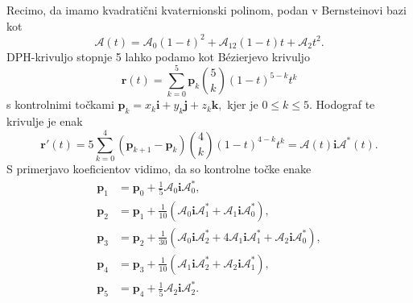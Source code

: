 \documentclass[12pt,a4paper,twoside]{article}
\theoremstyle{definition} %
\theoremstyle{plain} %
\theoremstyle{primerstyle}
\numberwithin{equation}{section}  %
\newcommand{\tV}{\mathbf{t}}
\newcommand{\pV}{\mathbf{p}}
\newcommand{\rV}{\mathbf{r}}
\newcommand{\iV}{\mathbf{i}}
\newcommand{\jV}{\mathbf{j}}
\newcommand{\kV}{\mathbf{k}}
\newcommand{\AQ}{\mathcal{A}}
\begin{document}
Recimo, da imamo kvadratični kvaternionski polinom, podan v Bernsteinovi bazi kot
\begin{equation}
	\label{hermite_bernstein_polinom}
	\AQ(t)=\AQ_0(1-t)^2+\AQ_12(1-t)t+\AQ_2t^2.
\end{equation}
DPH-krivuljo stopnje 5 lahko podamo kot Bézierjevo krivuljo
\begin{equation}
	\label{hermite_bezier_krivulja}
	\rV(t)=\sum_{k=0}^5\pV_k\binom{5}{k}(1-t)^{5-k}t^k
\end{equation}
s kontrolnimi točkami $\pV_k=x_k\iV+y_k\jV+z_k\kV,$ kjer je $0\leq k\leq5.$ Hodograf te krivulje je enak
\begin{equation}
	\label{hermite_hodograf}
	\rV'(t)=5\sum_{k=0}^4(\pV_{k+1}-\pV_k)\binom{4}{k}(1-t)^{4-k}t^k=\AQ(t)\iV\AQ^*(t).
\end{equation}
S primerjavo koeficientov vidimo, da so kontrolne točke enake
\begin{align}
	\label{hermit_kontrolne}
	\pV_1&=\pV_0+\frac{1}{5}\AQ_0\iV\AQ_0^*,\nonumber\\
	\pV_2&=\pV_1+\frac{1}{10}(\AQ_0\iV\AQ_1^*+\AQ_1\iV\AQ_0^*),\nonumber\\
	\pV_3&=\pV_2+\frac{1}{30}(\AQ_0\iV\AQ_2^*+4\AQ_1\iV\AQ_1^*+\AQ_2\iV\AQ_0^*),\\
	\pV_4&=\pV_3+\frac{1}{10}(\AQ_1\iV\AQ_2^*+\AQ_2\iV\AQ_1^*),\nonumber\\
	\pV_5&=\pV_4+\frac{1}{5}\AQ_2\iV\AQ_2^*.\nonumber
\end{align}
\end{document}
